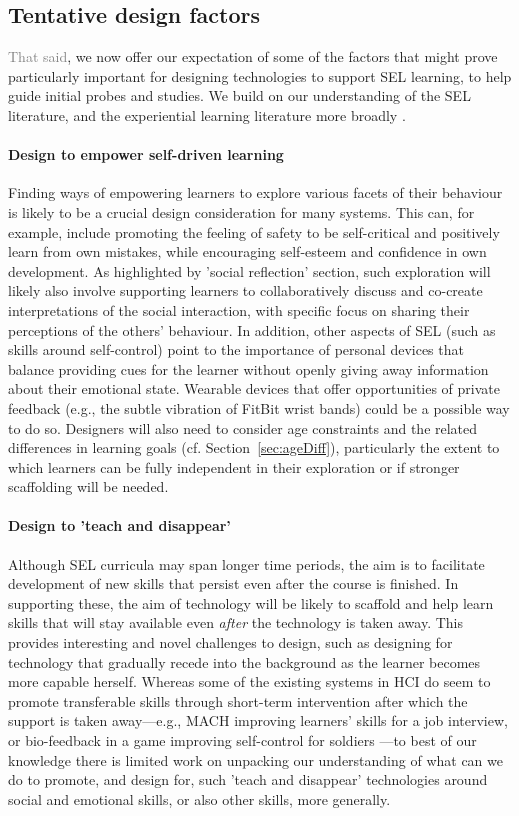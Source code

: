 \documentclass[prodmode,acmtochi]{acmsmall}
\newcommand{\rephrase}[1]{\textrm{\textrm{\textcolor{gray}{#1}}}}
\begin{document}
\subsection*{Tentative design factors}
\rephrase{That said}, we now offer our expectation of some of the factors that might prove particularly important for designing technologies to support SEL learning, to help guide initial probes and studies. We build on our understanding of the SEL literature, and the experiential learning literature more broadly \cite{Moon1999,Kolb2001,Griffith2000,Fleck2010}. 

\paragraph{Design to empower self-driven learning} Finding ways of empowering learners to explore various facets of their behaviour is likely to be a crucial design consideration for many systems. This can, for example, include promoting the feeling of safety to be self-critical and positively learn from own mistakes, while encouraging self-esteem and confidence in own development. As highlighted by 'social reflection' section, such exploration will likely also involve supporting learners to collaboratively discuss and co-create interpretations of the social interaction, with specific focus on sharing their perceptions of the others' behaviour. In addition, other aspects of SEL (such as skills around self-control) point to the importance of personal devices that balance providing cues for the learner without openly giving away information about their emotional state. Wearable devices that offer opportunities of private feedback (e.g., the subtle vibration of FitBit wrist bands) could be a possible way to do so. Designers will also need to consider age constraints and the related differences in learning goals
(cf. Section~\ref{sec:ageDiff}), particularly the extent to which learners can be fully independent in their exploration or if stronger scaffolding will be needed. 

\paragraph{Design to 'teach and disappear'} Although SEL curricula may span longer time periods, the aim is to facilitate development of new skills that persist even after the course is finished. In supporting these, the aim of technology will be likely to scaffold and help learn skills that will stay available even \emph{after} the technology is taken away. This provides interesting and novel challenges to design, such as designing for technology that gradually recede into the background as the learner becomes more capable herself.
%
Whereas some of the existing systems in HCI do seem to promote transferable skills through short-term intervention after which the support is taken away---e.g., MACH \cite{Hoque2013} improving learners' skills for a job interview, or bio-feedback in a game improving self-control for soldiers \cite{Bouchard2012}---to best of our knowledge there is limited work on unpacking our understanding of what can we do to promote, and design for, such 'teach and disappear' technologies around social and emotional skills, or also other skills, more generally. 
\end{document}
